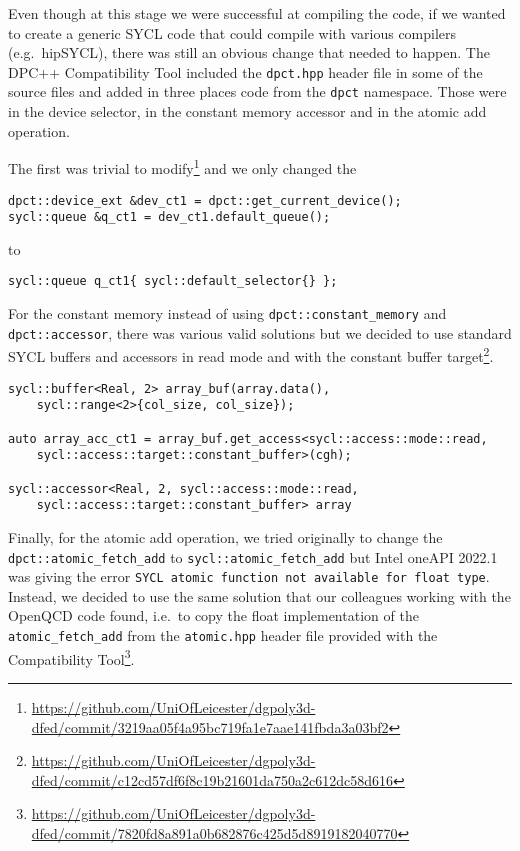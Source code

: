\documentclass[../main]{subfiles}
\begin{document}
Even though at this stage we were successful at compiling the code, if we wanted to create a generic SYCL code that could compile with various compilers (e.g.\ hipSYCL), there was still an obvious change that needed to happen.
The DPC++ Compatibility Tool included the \texttt{dpct.hpp} header file in some of the source files and added in three places code from the \texttt{dpct} namespace.
Those were in the device selector, in the constant memory accessor and in the atomic add operation.

The first was trivial to modify\footnote{\url{https://github.com/UniOfLeicester/dgpoly3d-dfed/commit/3219aa05f4a95bc719fa1e7aae141fbda3a03bf2}} and we only changed the
\begin{verbatim}
dpct::device_ext &dev_ct1 = dpct::get_current_device();
sycl::queue &q_ct1 = dev_ct1.default_queue();
\end{verbatim}
to
\begin{verbatim}
sycl::queue q_ct1{ sycl::default_selector{} };
\end{verbatim}

For the constant memory instead of using \texttt{dpct::constant\_memory} and \texttt{dpct::accessor}, there was various valid solutions but we decided to use standard SYCL buffers and accessors in read mode and with the constant buffer target\footnote{\url{https://github.com/UniOfLeicester/dgpoly3d-dfed/commit/c12cd57df6f8c19b21601da750a2c612dc58d616}}.
\begin{verbatim}
sycl::buffer<Real, 2> array_buf(array.data(),
    sycl::range<2>{col_size, col_size});

auto array_acc_ct1 = array_buf.get_access<sycl::access::mode::read,
    sycl::access::target::constant_buffer>(cgh);

sycl::accessor<Real, 2, sycl::access::mode::read,
    sycl::access::target::constant_buffer> array
\end{verbatim}

Finally, for the atomic add operation, we tried originally to change the \texttt{dpct::atomic\_fetch\_add} to \texttt{sycl::atomic\_fetch\_add} but Intel oneAPI 2022.1 was giving the error \texttt{SYCL atomic function not available for float type}.
Instead, we decided to use the same solution that our colleagues working with the OpenQCD code found, i.e.\ to copy the float implementation of the \texttt{atomic\_fetch\_add} from the \texttt{atomic.hpp} header file provided with the Compatibility Tool\footnote{\url{https://github.com/UniOfLeicester/dgpoly3d-dfed/commit/7820fd8a891a0b682876c425d5d8919182040770}}.
\end{document}
